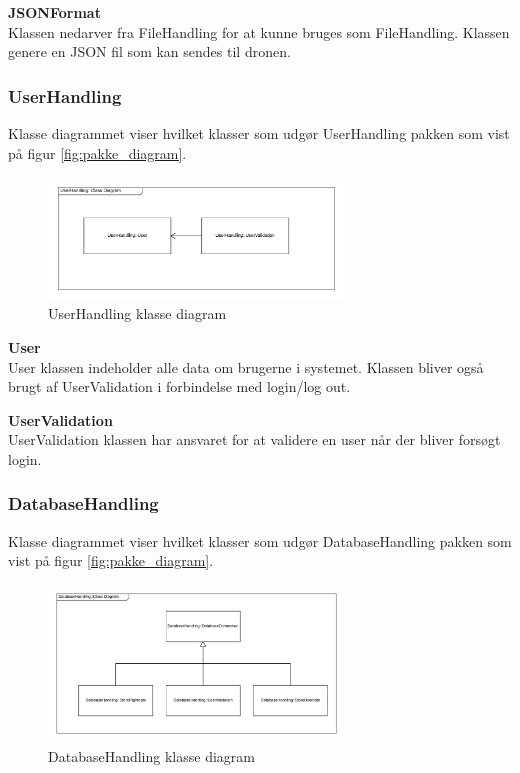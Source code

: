 \textbf{JSONFormat}\\
Klassen nedarver fra FileHandling for at kunne bruges som FileHandling. Klassen genere en JSON fil som kan sendes til dronen.

\newpage
\subsubsection*{UserHandling}
Klasse diagrammet viser hvilket klasser som udgør UserHandling pakken som vist på figur \ref{fig:pakke_diagram}.

\vspace{-5pt}
\begin{figure}[H]
	\centering
	\includegraphics[width=0.7\textwidth]{Billeder/klasse_diagrammer/UserHandlingDiagram.png}
	\vspace{-5pt}
	\caption{UserHandling klasse diagram}
	\label{fig:UserHandling_klasse_diagram}
\end{figure}

\textbf{User}\\
User klassen indeholder alle data om brugerne i systemet. Klassen bliver også brugt af UserValidation i forbindelse med login/log out.

\textbf{UserValidation}\\
UserValidation klassen har ansvaret for at validere en user når der bliver forsøgt login.\\

\newpage
\subsubsection*{DatabaseHandling}
Klasse diagrammet viser hvilket klasser som udgør DatabaseHandling pakken som vist på figur \ref{fig:pakke_diagram}.

\vspace{-5pt}
\begin{figure}[H]
	\centering
	\includegraphics[width=0.7\textwidth]{Billeder/klasse_diagrammer/DatabaseHandling.png}
	\vspace{-5pt}
	\caption{DatabaseHandling klasse diagram}
	\label{fig:DatabaseHandling_klasse_diagram}
\end{figure}


